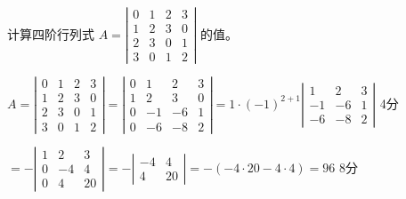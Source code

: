 \documentclass[noanswer]{USTBExam}
\begin{document}
\vfill



\begin{problem}
  计算四阶行列式 $A = \left|
    \begin{array}{cccc}
      0 & 1 & 2 & 3 \\
      1 & 2 & 3 & 0 \\
      2 & 3 & 0 & 1 \\
      3 & 0 & 1 & 2
    \end{array}
    \right|$ 的值。
\end{problem}

\bigskip

\begin{solution}
  $A = \left|
    \begin{array}{cccc}
      0 & 1 & 2 & 3 \\
      1 & 2 & 3 & 0 \\
      2 & 3 & 0 & 1 \\
      3 & 0 & 1 & 2
    \end{array}
    \right| = \left|
    \begin{array}{cccc}
      0 & 1   & 2   & 3 \\
      1 & 2   & 3   & 0 \\
      0 & - 1 & - 6 & 1 \\
      0 & - 6 & - 8 & 2
    \end{array}
    \right| = 1 \cdot (- 1)^{2 + 1} \left|
    \begin{array}{ccc}
      1   & 2   & 3 \\
      - 1 & - 6 & 1 \\
      - 6 & - 8 & 2
    \end{array}
    \right|$ \dotfill 4分\par
  \qquad\qquad $= -\left|
    \begin{array}{ccc}
      1 & 2   & 3  \\
      0 & - 4 & 4  \\
      0 & 4   & 20
    \end{array}
    \right| = - \left|
    \begin{array}{cc}
      - 4 & 4  \\
      4   & 20
    \end{array}
    \right| = -(-4\cdot20-4\cdot4) = 96$ \dotfill 8分
\end{solution}

\end{document}
